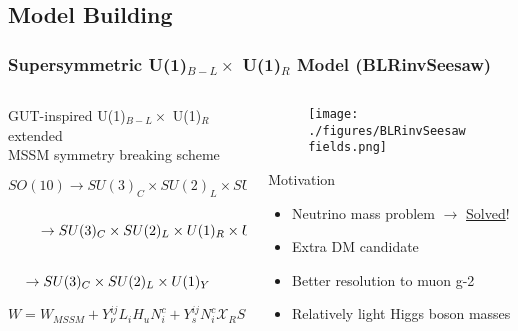 \documentclass[hyperref={bookmarks=false},aspectratio=169]{beamer}
\def\singR{\mathcal{X}_{R}}
\def\singRbar{\mathcal{\overline{X}}_{R}}
\begin{document}
\subsection{Model Building}


\begin{frame}
\frametitle{Supersymmetric U(1)$_{B-L} \times$ U(1)$_{R}$ Model (BLRinvSeesaw)}

\begin{columns}
\begin{column}{0.5\textwidth}
	\centering
	{\small GUT-inspired U(1)$_{B-L} \times$ U(1)$_{R}$ extended \\
		MSSM symmetry breaking scheme}

{\scriptsize 		$$SO(10) \to SU(3)_C \times SU(2)_L \times SU(2)_R \times U(1)_{B-L}$$ \\
	\vspace{-0.7cm}
	$$\hspace{0.8cm}\to SU(3)_C \times SU(2)_L \times U(1)_R \times U(1)_{B-L} $$ \\
    \vspace{-0.7cm}
	$$\hspace{-0.5cm}\to SU(3)_C \times SU(2)_L \times  U(1)_{Y} $$}

\pause


$W= W_{MSSM} +Y_{\nu}^{ij}L_{i}H_{u}N^{c}_{i}+ Y^{ij}_{s}N^{c}_{i}\singR S - \mu_{R}\singRbar \singR + \mu_{S}S S $


\end{column}

\begin{column}{0.5\textwidth}
	\color{red}
	\centering
	
\begin{figure}
	\texttt{[image: ./figures/BLRinvSeesawfields.png]}
\end{figure}
\pause
	\vspace{-0.5cm}
	\begin{alertblock}{ Motivation}
		\begin{itemize}
			\centering
			\item  Neutrino mass problem $\rightarrow$ \underline{Solved}!
			\item Extra DM candidate
			\item Better resolution to muon g-2
			\item Relatively light Higgs boson masses
		\end{itemize}
	\end{alertblock}
	
\end{column}
\end{columns}	

\end{frame}
\end{document}
